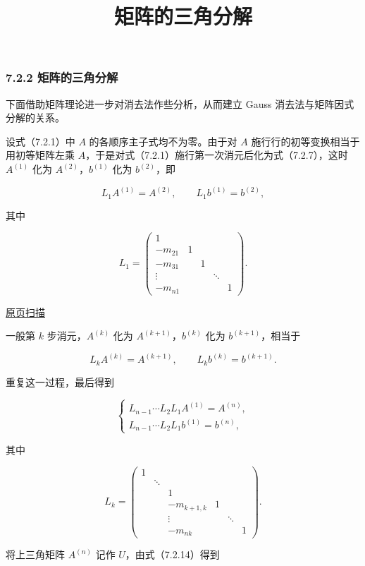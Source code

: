 \documentclass[
  10pt,
  fontset=fandol]{ctexart}
\title{矩阵的三角分解}
\author{}
\date{}
\begin{document}
\maketitle

\subsubsection{7.2.2 矩阵的三角分解}\label{ux77e9ux9635ux7684ux4e09ux89d2ux5206ux89e3}

下面借助矩阵理论进一步对消去法作些分析，从而建立 Gauss 消去法与矩阵因式分解的关系。

设式（7.2.1）中 \(A\) 的各顺序主子式均不为零。由于对 \(A\) 施行行的初等变换相当于用初等矩阵左乘 \(A\)，于是对式（7.2.1）施行第一次消元后化为式（7.2.7），这时 \(A^{(1)}\) 化为 \(A^{(2)}\)，\(b^{(1)}\) 化为 \(b^{(2)}\)，即

\[L_1A^{(1)}=A^{(2)},\qquad L_1b^{(1)}=b^{(2)},\]

其中

\[
L_1=\begin{pmatrix}
1&&&&\\
-m_{21}&1&&&\\
-m_{31}&&1&&\\
\vdots&&&\ddots&\\
-m_{n1}&&&&1
\end{pmatrix}.
\]

\href{../../source-images/pdf-182.jpeg}{原页扫描}

一般第 \(k\) 步消元，\(A^{(k)}\) 化为 \(A^{(k+1)}\)，\(b^{(k)}\) 化为 \(b^{(k+1)}\)，相当于

\[L_kA^{(k)}=A^{(k+1)},\qquad L_kb^{(k)}=b^{(k+1)}.\]

重复这一过程，最后得到

\[
\begin{cases}
L_{n-1}\cdots L_2L_1A^{(1)}=A^{(n)},\\
L_{n-1}\cdots L_2L_1b^{(1)}=b^{(n)},
\end{cases}
\tag{7.2.14}
\]

其中

\[
L_k=\begin{pmatrix}
1&&&&&\\
&\ddots&&&&\\
&&1&&&\\
&&-m_{k+1,k}&1&&\\
&&\vdots&&\ddots&\\
&&-m_{nk}&&&1
\end{pmatrix}.
\]

将上三角矩阵 \(A^{(n)}\) 记作 \(U\)，由式（7.2.14）得到
\end{document}
